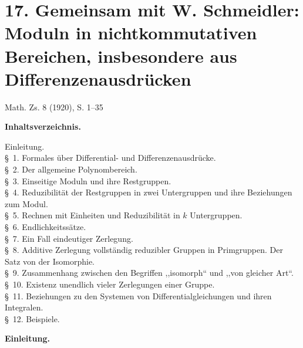 \documentclass[11pt]{article}
\begin{document}
\clearpage
\setcounter{footnote}{0}
\section*{17. Gemeinsam mit W. Schmeidler: Moduln in nichtkommutativen Bereichen, insbesondere aus Differenzenausdrücken}
\begin{center}
Math. Zs. 8 (1920), S. 1--35
\end{center}

\begin{center}
\textbf{Inhaltsverzeichnis.}
\end{center}
\begin{center}
\begin{minipage}{0.82\linewidth}
Einleitung.\\
\S~1. Formales über Differential- und Differenzenausdrücke.\\
\S~2. Der allgemeine Polynombereich.\\
\S~3. Einseitige Moduln und ihre Restgruppen.\\
\S~4. Reduzibilität der Restgruppen in zwei Untergruppen und ihre Beziehungen zum Modul.\\
\S~5. Rechnen mit Einheiten und Reduzibilität in $k$ Untergruppen.\\
\S~6. Endlichkeitssätze.\\
\S~7. Ein Fall eindeutiger Zerlegung.\\
\S~8. Additive Zerlegung vollständig reduzibler Gruppen in Primgruppen. Der Satz von der Isomorphie.\\
\S~9. Zusammenhang zwischen den Begriffen ,,isomorph`` und ,,von gleicher Art``.\\
\S~10. Existenz unendlich vieler Zerlegungen einer Gruppe.\\
\S~11. Beziehungen zu den Systemen von Differentialgleichungen und ihren Integralen.\\
\S~12. Beispiele.
\end{minipage}
\end{center}

\begin{center}\textbf{Einleitung.}\end{center}
\end{document}
